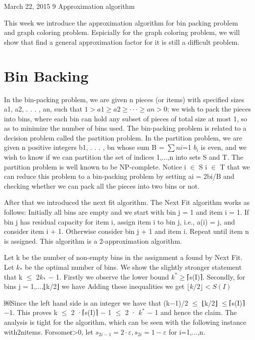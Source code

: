 \documentclass[usletter]{article}
\begin{document}
           {March 22, 2015}                          %
           {9}                                       %
           {Approximation algorithm}  %

\noindent
This week we introduce the approximation algorithm for bin packing problem and graph coloring problem. Espicially for the graph coloring problem, we will show that find a general approximation factor for it is still a difficult problem.

\section{Bin Backing}
In the bin-packing problem, we are given n pieces (or items) with specified sizes a1, a2, . . . , an, such that
$1 > a1 \ge a2 \ge ···\ge an >0$;
we wish to pack the pieces into bins, where each bin can hold any subset of pieces of total size at most 1, so as to minimize the number of bins used.
The bin-packing problem is related to a decision problem called the partition problem. In
the partition problem, we are given n positive integers b1, . . . , bn whose sum B = $\sum{ni}$=1 $b_i$ is
even, and we wish to know if we can partition the set of indices {1,...,n} into sets S and T. The partition problem is well known to be NP-complete. Notice i $\in$ S i $\in$ T
that we can reduce this problem to a bin-packing problem by setting ai = 2bi/B and checking whether we can pack all the pieces into two bins or not.

After that we introduced the next fit algorithm.
The Next Fit algorithm works as follows: Initially all bins are empty and we start with bin j = 1 and item i = 1. If bin j has residual capacity for item i, assign item i to bin j, i.e., a(i) = j, and consider item i + 1. Otherwise consider bin j + 1 and item i. Repeat until item n is assigned. This algorithm is a 2-approximation algorithm.

Let k be the number of non-empty bins in the assignment a found by Next Fit. Let $k_*$ be the optimal number of bins. We show the slightly stronger statement that
k $\le$ 2$k_*$ − 1.
Firstly we observe the lower bound $k^* \ge$⌈s(I)⌉. Secondly, for bins j = 1,...,⌊k/2⌋ we
have
Adding these inequalities we get $⌊k/2⌋ < S(I)$

￼Since the left hand side is an integer we have that (k−1)/2 $\le$ ⌊k/2⌋ $\le$⌈s(I)⌉−1.
This proves k $\le$ 2 ·⌈s(I)⌉ − 1 $\le$ 2 · $k^*$ − 1 and hence the claim.
The analysis is tight for the algorithm, which can be seen with the following instance with2nitems. Forsomeε>0, let $s_{2i−1} =2·ε,s_{2i} =1−ε$ for i=1,...,n.
\end{document}
